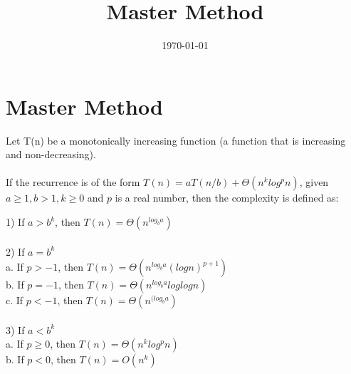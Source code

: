 \documentclass[a4paper, 12pt]{article}
\begin{document}
\title{Master Method}
\date{\today}
\pagestyle{empty} 
\section*{Master Method}
Let T(n) be a monotonically increasing function (a function that is increasing and non-decreasing).\\
	\\
	If the recurrence is of the form $T(n) = aT(n/b) + \Theta(n^k log^p n)$, given $a \geq 1, b > 1, k \geq 0$ and $p$ is a real number, then the complexity is defined as:\\
	
\begin{tabbing}
1) If $a > b^k$, then $T(n) = \Theta(n^{log_b a})$ \\
\\
2) If $a = b^k$ \=\\
\> a. If $p > -1$, then $T(n) = \Theta(n^{log_b a} (log n)^{p+1})$	\\
\> b. If $p = -1$, then $T(n) = \Theta(n^{log_b a} log log n)$ \\
\> c. If $p < -1$, then $T(n) = \Theta(n^{(log_b a})$\\
\\
3) If $a < b^k$ \\
\> a. If $p \geq 0$, then $T(n) = \Theta(n^k log^p n)$\\
\> b. If $p < 0$, then $T(n) = O(n^k)$ \\
\end{tabbing}
\end{document}
